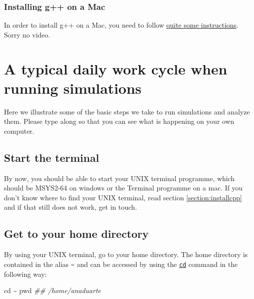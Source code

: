 \documentclass[
]{book}
\newenvironment{Shaded}{\begin{snugshade}}{\end{snugshade}}
\newcommand{\BuiltInTok}[1]{#1}
\newcommand{\CommentTok}[1]{\textcolor[rgb]{0.56,0.35,0.01}{\textit{#1}}}
\newcommand{\NormalTok}[1]{#1}
\begin{document}
\hypertarget{installing-g-on-a-mac}{%
\subsection{Installing g++ on a Mac}\label{installing-g-on-a-mac}}

In order to install g++ on a Mac, you need to follow \href{https://www.freecodecamp.org/news/install-xcode-command-line-tools/}{quite some instructions}. Sorry no video.

\hypertarget{a-typical-daily-work-cycle-when-running-simulations}{%
\chapter{A typical daily work cycle when running simulations}\label{a-typical-daily-work-cycle-when-running-simulations}}

Here we illustrate some of the basic steps we take to run simulations and analyze them. Please type along so that you can see what is happening on your own computer.

\hypertarget{start-the-terminal}{%
\section{Start the terminal}\label{start-the-terminal}}

By now, you should be able to start your UNIX terminal programme, which should be MSYS2-64 on windows or the Terminal programme on a mac. If you don't know where to find your UNIX terminal, read section \ref{section:installcpp} and if that still does not work, get in touch.

\hypertarget{section:homedir}{%
\section{Get to your home directory}\label{section:homedir}}

By using your UNIX terminal, go to your home directory. The home directory is contained in the alias \texttt{\textasciitilde{}} and can be accessed by using the \href{https://www.tutorialspoint.com/unix_commands/cd.htm}{\texttt{cd}} command in the following way:

\begin{Shaded}
\begin{Highlighting}[]
\BuiltInTok{cd}\NormalTok{ \textasciitilde{}}
\BuiltInTok{pwd}
\CommentTok{\#\# /home/anaduarte}
\end{Highlighting}
\end{Shaded}
\end{document}
